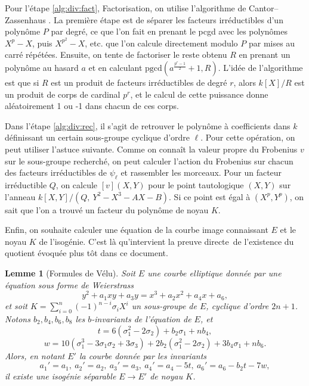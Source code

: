 \documentclass[11pt,a4paper]{article}
\newcommand{\vers}{\longrightarrow}
\renewcommand{\frak}{\mathfrak}
\renewcommand{\mod}{\ \mathrm{mod}\ }
\renewcommand{\v}{\vspace{5mm}}
\newtheorem*{lem}{Lemme}
\theoremstyle{definition}
\begin{document}
Pour l'étape \ref{alg:div:fact}, {\sc Factorisation}, on utilise l'algorithme de Cantor--Zassenhaus \cite{vzGG}. La première étape est de séparer les facteurs irréductibles d'un polynôme $P$ par degré, ce que l'on fait en prenant le pcgd avec les polynômes $X^p - X$, puis $X^{p^2} - X$, etc. que l'on calcule directement modulo $P$ par mises au carré répétées. Ensuite, on tente de factoriser le reste obtenu $R$ en prenant un polynôme au hasard $a$ et en calculant $\mathrm{pgcd}(a^{\frac{p^r - 1}{2}} + 1, R)$. L'idée de l'algorithme est que si $R$ est un produit de facteurs irréductibles de degré $r$, alors $k[X]/R$ est un produit de corps de cardinal $p^r$, et le calcul de cette puissance donne aléatoirement 1 ou -1 dans chacun de ces corps.
\v

Dans l'étape \ref{alg:div:rec}, il s'agit de retrouver le polynôme à coefficients dans $k$ définissant un certain sous-groupe cyclique d'ordre $\ell$. Pour cette opération, on peut utiliser l'astuce suivante. Comme on connaît la valeur propre du Frobenius $v$ sur le sous-groupe recherché, on peut calculer l'action du Frobenius sur chacun des facteurs irréductibles de $\psi_\ell$ et rassembler les morceaux. Pour un facteur irréductible $Q$, on calcule $[v](X, Y)$ pour le point tautologique $(X, Y)$ sur l'anneau $k[X, Y]/(Q,\ Y^2 - X^3 - AX - B).$ Si ce point est égal à $(X^p, Y^p)$, on sait que l'on a trouvé un facteur du polynôme de noyau $K$.
\v
%

Enfin, on souhaite calculer une équation de la courbe image connaissant $E$ et le noyau $K$ de l'isogénie. C'est là qu'intervient la preuve \og directe\fg\ de l'existence du quotient évoquée plus tôt dans ce document.

\begin{lem}[Formules de Vélu]
Soit $E$ une courbe elliptique donnée par une équation sous forme de Weierstrass
$$y^2 + a_1 x y + a_3 y = x^3 + a_2 x^2 + a_4 x + a_6,$$
et soit $K = \sum_{i=0}^n (-1)^{n-i} \sigma_i X^i$ un sous-groupe de $E$, cyclique d'ordre $2n+1$. Notons $b_2, b_4, b_6, b_8$ les $b$-invariants de l'équation de $E$, et 
$$ t = 6(\sigma_1^2 - 2 \sigma_2) + b_2 \sigma_1 + n b_4,$$
$$ w = 10 (\sigma_1^3 - 3 \sigma_1 \sigma_2 + 3 \sigma_3) + 2  b_2 (\sigma_1^2 - 2 \sigma_2) + 3 b_4 \sigma_1 + n b_6.$$
Alors, en notant $E'$ la courbe donnée par les invariants
$$ a_1' = a_1,\ a_2' = a_2,\ a_3' = a_3,\ a_4' = a_4 - 5 t,\ a_6' = a_6 - b_2 t - 7 w,$$
il existe une isogénie séparable $E\vers E'$ de noyau $K$.
\end{lem}
\end{document}
